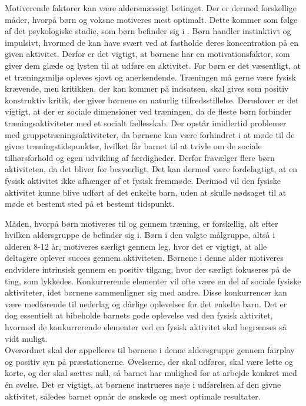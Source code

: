 Motiverende faktorer kan være aldersmæssigt betinget. Der er dermed forskellige måder, hvorpå børn og voksne motiveres mest optimalt. Dette kommer som følge af det psykologiske stadie, som børn befinder sig i \citep{V.Brown2007}. Børn handler instinktivt og impulsivt, hvormed de kan have svært ved at fastholde deres koncentration på en given aktivitet. Derfor er det vigtigt, at børnene har en motivationsfaktor, som giver dem glæde og lysten til at udføre en aktivitet. \citep{V.Brown2007} \newline
For børn er det væsentligt, at et træningsmiljø opleves sjovt og anerkendende. Træningen må gerne være fysisk krævende, men kritikken, der kan kommer på indsatsen, skal gives som positiv konstruktiv kritik, der giver børnene en naturlig tilfredsstillelse. Derudover er det vigtigt, at der er sociale dimensioner ved træningen, da de fleste børn forbinder træningsaktiviteter med et socialt fællesskab. Der opstår imidlertid problemer med gruppetræningsaktiviteter, da børnene kan være forhindret i at møde til de givne træningstidspunkter, hvilket får barnet til at tvivle om de sociale tilhørsforhold og egen udvikling af færdigheder. Derfor fravælger flere børn aktiviteten, da det bliver for besværligt. Det kan dermed være fordelagtigt, at en fysisk aktivitet ikke afhænger af et fysisk fremmøde. Derimod vil den fysiske aktivitet kunne blive udført af det enkelte barn, uden at skulle nødsaget til at møde et bestemt sted på et bestemt tidspunkt.  \citep{Wied2011,Romani2013}\newline

Måden, hvorpå børn motiveres til og gennem træning, er forskellig, alt efter hvilken aldersgruppe de befinder sig i. Børn i den valgte målgruppe, altså i alderen 8-12 år, motiveres særligt gennem leg, hvor det er vigtigt, at alle deltagere oplever succes gennem aktiviteten. Børnene i denne alder motiveres endvidere intrinsisk gennem en positiv tilgang, hvor der særligt fokuseres på de ting, som lykkedes. Konkurrerende elementer vil ofte være en del af sociale fysiske aktiviteter, idet børnene sammenligner sig med andre. Disse konkurrencer kan være medførende til nederlag og dårlige oplevelser for det enkelte barn. Det er dog essentielt at bibeholde barnets gode oplevelse ved den fysisk aktivitet, hvormed de konkurrerende elementer ved en fysisk aktivitet skal begrænses så vidt muligt.\\
Overordnet skal der appelleres til børnene i denne aldersgruppe gennem fairplay og positiv syn på præstationerne. Øvelserne, der skal udføres, skal være lette og korte, og der skal sættes mål, så barnet har mulighed for at arbejde konkret med én øvelse. Det er vigtigt, at børnene instrueres nøje i udførelsen af den givne aktivitet, således barnet opnår de ønskede og mest optimale resultater. \citep{Wied2011} 

